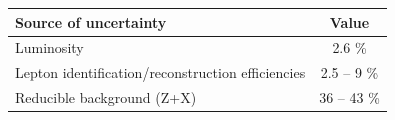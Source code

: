 \begin{table}[!htb]
\begin{center}
\small
\begin{tabular}{l|c} 
\hline %
Source of uncertainty & Value \\
\hline %
Luminosity & 2.6 \%  \\ 
Lepton identification/reconstruction efficiencies & 2.5 -- 9 \% \\ 
Reducible background (Z+X) & 36 -- 43 \% \\ 

\end{tabular}
\end{center}
\end{table}
